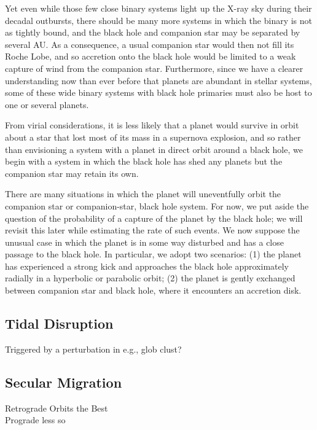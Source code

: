 Yet even while those few close binary systems light up the X-ray sky
during their decadal outbursts, there should be many more systems in
which the binary is not as tightly bound, and the black hole and
companion star may be separated by several AU.  As a consequence, a
usual companion star would then not fill its Roche Lobe, and so
accretion onto the black hole would be limited to a weak capture of
wind from the companion star.  Furthermore, since we have a clearer
understanding now than ever before that planets are abundant in
stellar systems, some of these wide binary systems with black hole
primaries must also be host to one or several planets.  


From virial considerations, it is less likely that a planet would
survive in orbit about a star that lost most of its mass in a
supernova explosion, and so rather than envisioning a system with a
planet in direct orbit around a black hole, we begin with a system in
which the black hole has shed any planets but the companion star may
retain its own.


There are many situations in which the planet will uneventfully orbit
the companion star or companion-star, black hole system.  For now, we
put aside the question of the probability of a capture of the planet
by the black hole; we will revisit this later while estimating the
rate of such events.  We now suppose the unusual case in which the
planet is in some way disturbed and has a close passage to the black
hole.  In particular, we adopt two scenarios: (1) the planet has
experienced a strong kick and approaches the black hole approximately
radially in a hyperbolic or parabolic orbit; (2) the planet is gently
exchanged between companion star and black hole, where it encounters
an accretion disk.


\subsection{Tidal Disruption}
Triggered by a perturbation in e.g., glob clust?


\subsection{Secular Migration}
Retrograde Orbits the Best\\
Prograde less so
